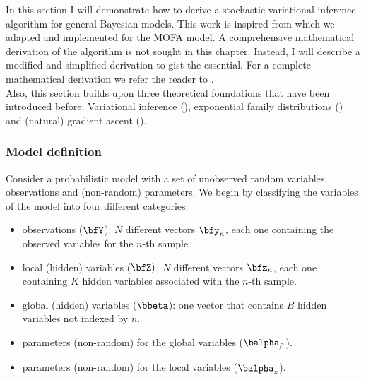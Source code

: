 In this section I will demonstrate how to derive a stochastic variational inference algorithm for general Bayesian models. This work is inspired from \cite{Hoffman2012} which we adapted and implemented for the MOFA model. A comprehensive mathematical derivation of the algorithm is not sought in this chapter. Instead, I will describe a modified and simplified derivation to gist the essential. For a complete mathematical derivation we refer the reader to \cite{Hoffman2012}.\\
Also, this section builds upon three theoretical foundations that have been introduced before: Variational inference (), exponential family distributions () and (natural) gradient ascent ().






\subsubsection{Model definition}

Consider a probabilistic model with a set of unobserved random variables, observations and (non-random) parameters. We begin by classifying the variables of the model into four different categories:

\begin{itemize}
	\item observations ($\bfY$): $N$ different vectors $\bfy_{n}$, each one containing the observed variables for the $n$-th sample.
	\item local (hidden) variables ($\bfZ)$: $N$ different vectors $\bfz_{n}$, each one containing $K$ hidden variables associated with the $n$-th sample.
	\item global (hidden) variables ($\bbeta$): one vector that contains $B$ hidden variables not indexed by $n$.
	\item parameters (non-random) for the global variables ($\balpha_{\beta}$).
	\item parameters (non-random) for the local variables ($\balpha_{z}$).
\end{itemize}


